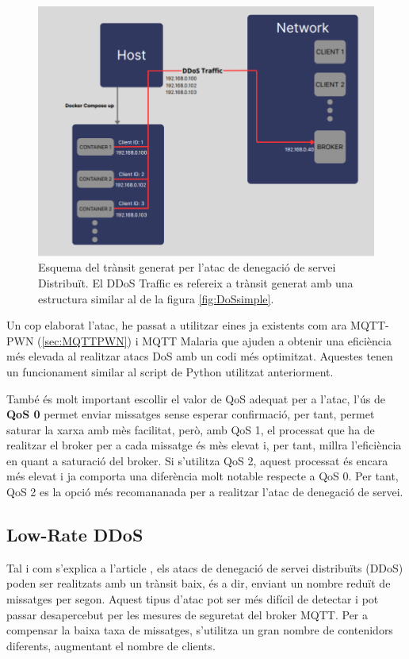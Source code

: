   \begin{figure}[H]
    \centering
    \includegraphics[width=1\textwidth]{img/DDoS.png}
    \caption{Esquema del trànsit generat per l'atac de denegació de servei Distribuït. El DDoS Traffic es refereix a trànsit generat amb una estructura similar al de la figura \ref{fig:DoSsimple}.}
    \label{fig:DDoS}
  \end{figure}

Un cop elaborat l'atac, he passat a utilitzar eines ja existents com ara MQTT-PWN (\ref{sec:MQTTPWN}) i MQTT Malaria que ajuden a obtenir una eficiència més elevada al realitzar atacs DoS amb un codi més optimitzat. Aquestes tenen un funcionament similar al script de Python utilitzat anteriorment.

També és molt important escollir el valor de QoS adequat per a l'atac, l'ús de \textbf{QoS 0} permet enviar missatges sense esperar confirmació, per tant, permet saturar la xarxa amb mès facilitat, però, amb QoS 1, el processat que ha de realitzar el broker per a cada missatge és mès elevat i, per tant, millra l'eficiència en quant a saturació del broker. Si s'utilitza QoS 2, aquest processat és encara més elevat i ja comporta una diferència molt notable respecte a QoS 0. Per tant, QoS 2 es la opció més recomananada per a realitzar l'atac de denegació de servei. 

\subsection{Low-Rate DDoS}

Tal i com s'explica a l'article \cite{lowrateDDoSexp}, els atacs de denegació de servei distribuïts (DDoS) poden ser realitzats amb un trànsit baix, és a dir, enviant un nombre reduït de missatges per segon. Aquest tipus d'atac pot ser més difícil de detectar i pot passar desapercebut per les mesures de seguretat del broker MQTT. Per a compensar la baixa taxa de missatges, s'utilitza un gran nombre de contenidors diferents, augmentant el nombre de clients.